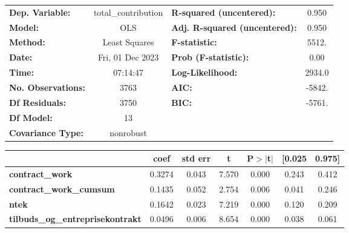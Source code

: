 \begin{center}
\begin{tabular}{lclc}
\toprule
\textbf{Dep. Variable:}                  & total\_contribution & \textbf{  R-squared (uncentered):}      &     0.950   \\
\textbf{Model:}                          &         OLS         & \textbf{  Adj. R-squared (uncentered):} &     0.950   \\
\textbf{Method:}                         &    Least Squares    & \textbf{  F-statistic:       }          &     5512.   \\
\textbf{Date:}                           &   Fri, 01 Dec 2023  & \textbf{  Prob (F-statistic):}          &     0.00    \\
\textbf{Time:}                           &       07:14:47      & \textbf{  Log-Likelihood:    }          &    2934.0   \\
\textbf{No. Observations:}               &          3763       & \textbf{  AIC:               }          &    -5842.   \\
\textbf{Df Residuals:}                   &          3750       & \textbf{  BIC:               }          &    -5761.   \\
\textbf{Df Model:}                       &            13       & \textbf{                     }          &             \\
\textbf{Covariance Type:}                &      nonrobust      & \textbf{                     }          &             \\
\bottomrule
\end{tabular}
\begin{tabular}{lcccccc}
                                         & \textbf{coef} & \textbf{std err} & \textbf{t} & \textbf{P$> |$t$|$} & \textbf{[0.025} & \textbf{0.975]}  \\
\midrule
\textbf{contract\_work}                  &       0.3274  &        0.043     &     7.570  &         0.000        &        0.243    &        0.412     \\
\textbf{contract\_work\_cumsum}          &       0.1435  &        0.052     &     2.754  &         0.006        &        0.041    &        0.246     \\
\textbf{ntek}                            &       0.1642  &        0.023     &     7.219  &         0.000        &        0.120    &        0.209     \\
\textbf{tilbuds\_og\_entreprisekontrakt} &       0.0496  &        0.006     &     8.654  &         0.000        &        0.038    &        0.061     \\

\end{tabular}
\end{center}
